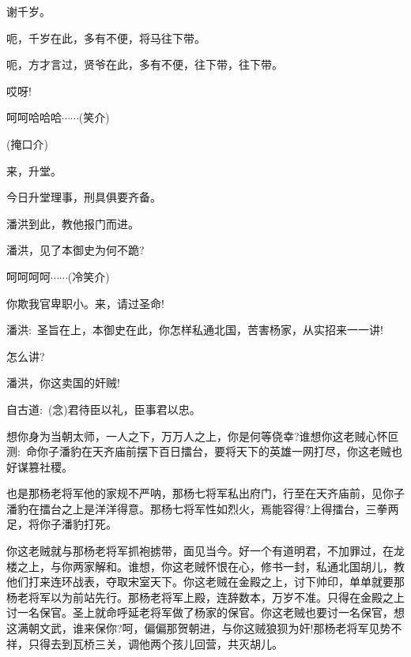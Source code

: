 {{谢千岁。}

{呃，千岁在此，多有不便，将马往下带。}

{呃，方才言过，贤爷在此，多有不便，往下带，往下带。}

{哎呀!}




{呵呵哈哈哈$\cdots{}\cdots{}$({\hwfs 笑介})}

{({\hwfs 掩口介})}

\vspace{5pt}


{来，升堂。}

{今日升堂理事，刑具俱要齐备。}

{潘洪到此，教他报门而进。}

{潘洪，见了本御史为何不跪?}

{呵呵呵呵$\cdots{}\cdots{}$({\hwfs 冷笑介})}

{你欺我官卑职小。来，请过圣命!}

{潘洪:~圣旨在上，本御史在此，你怎样私通北国，苦害杨家，从实招来一一讲!}

{怎么讲?}

{潘洪，你这卖国的奸贼!}

{自古道:~({\akai 念})君待臣以礼，臣事君以忠。}

{想你身为当朝太师，一人之下，万万人之上，你是何等侥幸?谁想你这老贼心怀叵测:~命你子潘豹在天齐庙前摆下百日擂台，要将天下的英雄一网打尽，你这老贼也好谋篡社稷。}

{也是那杨老将军他的家规不严呐，那杨七将军私出府门，行至在天齐庙前，见你子潘豹在擂台之上是洋洋得意。那杨七将军性如烈火，焉能容得?上得擂台，三拳两足，将你子潘豹打死。}

{你这老贼就与那杨老将军抓袍掳带，面见当今。好一个有道明君，不加罪过，在龙楼之上，与你两家解和。谁想，你这老贼怀恨在心，修书一封，私通北国胡儿，教他们打来连环战表，夺取宋室天下。你这老贼在金殿之上，讨下帅印，单单就要那杨老将军以为前站先行。那杨老将军上殿，连辞数本，万岁不准。只得在金殿之上讨一名保官。圣上就命呼延老将军做了杨家的保官。你这老贼也要讨一名保官，想这满朝文武，谁来保你?呵，偏偏那贺朝进，与你这贼狼狈为奸!那杨老将军见势不祥，只得去到瓦桥三关，调他两个孩儿回营，共灭胡儿。}

}
